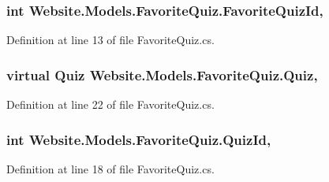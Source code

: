\subsubsection[{Favorite\+Quiz\+Id}]{\setlength{\rightskip}{0pt plus 5cm}int Website.\+Models.\+Favorite\+Quiz.\+Favorite\+Quiz\+Id\hspace{0.3cm}{\ttfamily [get]}, {\ttfamily [set]}}\label{class_website_1_1_models_1_1_favorite_quiz_a0dcb4d96d383cfb2f33492c4ee2564a0}


Definition at line 13 of file Favorite\+Quiz.\+cs.

\hypertarget{class_website_1_1_models_1_1_favorite_quiz_a760d134e23df9c7b1be5e520263e42b0}{}
\subsubsection[{Quiz}]{\setlength{\rightskip}{0pt plus 5cm}virtual {\bf Quiz} Website.\+Models.\+Favorite\+Quiz.\+Quiz\hspace{0.3cm}{\ttfamily [get]}, {\ttfamily [set]}}\label{class_website_1_1_models_1_1_favorite_quiz_a760d134e23df9c7b1be5e520263e42b0}


Definition at line 22 of file Favorite\+Quiz.\+cs.

\hypertarget{class_website_1_1_models_1_1_favorite_quiz_aa9bb9f6b3f135d2105efc657999cc7fa}{}
\subsubsection[{Quiz\+Id}]{\setlength{\rightskip}{0pt plus 5cm}int Website.\+Models.\+Favorite\+Quiz.\+Quiz\+Id\hspace{0.3cm}{\ttfamily [get]}, {\ttfamily [set]}}\label{class_website_1_1_models_1_1_favorite_quiz_aa9bb9f6b3f135d2105efc657999cc7fa}


Definition at line 18 of file Favorite\+Quiz.\+cs.

\hypertarget{class_website_1_1_models_1_1_favorite_quiz_a93771e9824a5520ff5e9d0c77c0a9058}{}
